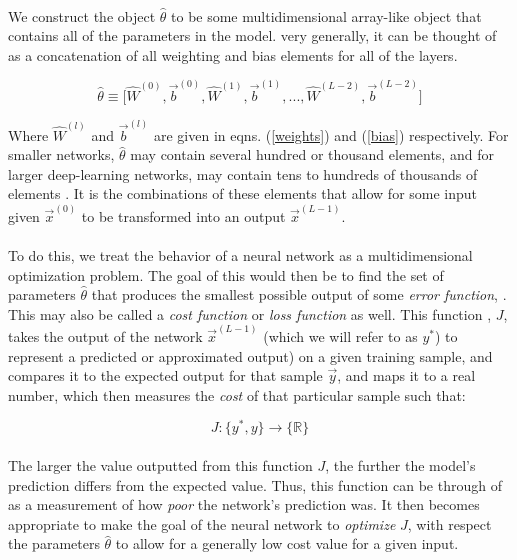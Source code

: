 \documentclass[12pt,letterpaper]{article}
\begin{document}
\paragraph*{}We construct the object $\hat{\theta}$ to be some multidimensional array-like object that contains all of the parameters in the model. very generally, it can be thought of as a concatenation of all weighting and bias elements for all of the layers. 

\begin{equation}
\label{theta}
\hat{\theta} \equiv \big[ \hat{W}^{(0)} , \vec{b}^{(0)} , \hat{W}^{(1)} , \vec{b}^{(1)} ,
							... , \hat{W}^{(L-2)} , \vec{b}^{(L-2)} 	\big]
\end{equation}

Where $\hat{W}^{(l)}$ and $\vec{b}^{(l)}$ are given in eqns. (\ref{weights}) and (\ref{bias}) respectively. For smaller networks, $\hat{\theta}$ may contain several hundred or thousand elements, and for larger deep-learning networks, may contain tens to hundreds of thousands of elements \cite{Goodfellow,Loy}. It is the combinations of these elements that allow for some input given $\vec{x}^{(0)}$ to be transformed into an output $\vec{x}^{(L-1)}$.

\paragraph*{}To do this, we treat the behavior of a neural network as a multidimensional optimization problem. The goal of this would then be to find the set of parameters $\hat{\theta}$ that produces the smallest possible output of some \textit{error function}, \cite{Goodfellow,James,Petrik}. This may also be called a \textit{cost function} or \textit{loss function} as well. This function , $J$, takes the output of the network $\vec{x}^{(L-1)}$ (which we will refer to as $y^*$) to represent a predicted or approximated output) on a given training sample, and compares it to the expected output for that sample $\vec{y}$, and maps it to a real number, which then measures the \textit{cost} of that particular sample such that:

\begin{equation}
\label{cost func}
J : \big\{ y^* , y  \big\} \rightarrow \big\{ \mathbb{R} \big\}
\end{equation}	

\paragraph*{}The larger the value outputted from this function $J$, the further the model's prediction differs from the expected value. Thus, this function can be through of as a measurement of how \textit{poor} the network's prediction was. It then becomes appropriate to make the goal of the neural network to \textit{optimize} $J$, with respect the parameters $\hat{\theta}$ to allow for a generally low cost value for a given input.
\end{document}
